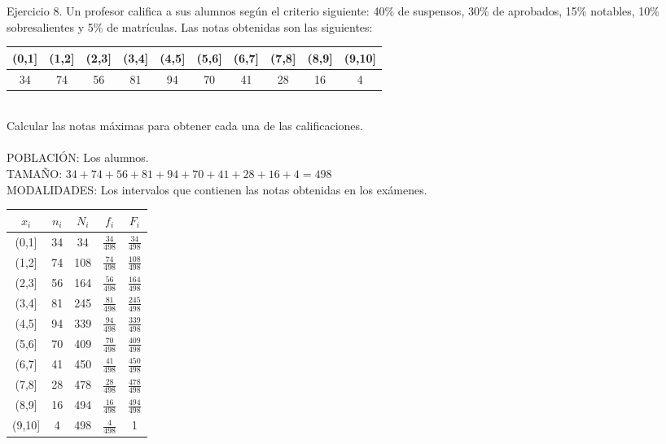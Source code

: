 \documentclass{article}
\begin{document}
    Ejercicio 8. Un profesor califica a sus alumnos según el criterio siguiente: 40\% de suspensos, 30\% de aprobados, 15\% notables, 10\% sobresalientes y 5\% de matrículas. Las notas obtenidas son las siguientes: \\
    
    \begin{tabular}{| c | c | c | c | c | c | c | c | c | c |}
        \hline
        (0,1] & (1,2] & (2,3] & (3,4] & (4,5] & (5,6] & (6,7] & (7,8] & (8,9] & (9,10] \\ \hline
        34 & 74 & 56 & 81 & 94 & 70 & 41 & 28 & 16 & 4 \\ \hline
    \end{tabular} \\
    
    Calcular las notas máximas para obtener cada una de las calificaciones. 
    \\
    \\
    POBLACIÓN: Los alumnos. \\
    TAMAÑO: $34+74+56+81+94+70+41+28+16+4=498$ \\
    MODALIDADES: Los intervalos que contienen las notas obtenidas en los exámenes. \\
    
    \begin{center}
    \begin{tabular}{| c | c | c | c | c |}
        \hline
        $x_i$ & $n_i$ & $N_i$ & $f_i$ & $F_i$ \\ \hline
        (0,1] & 34 & 34 & $\frac{34}{498}$ & $\frac{34}{498}$ \\
        (1,2] & 74 & 108 & $\frac{74}{498}$ & $\frac{108}{498}$ \\
        (2,3] & 56 & 164 & $\frac{56}{498}$ & $\frac{164}{498}$ \\
        (3,4] & 81 & 245 & $\frac{81}{498}$ & $\frac{245}{498}$ \\
        (4,5] & 94 & 339 & $\frac{94}{498}$ & $\frac{339}{498}$ \\
        (5,6] & 70 & 409 & $\frac{70}{498}$ & $\frac{409}{498}$\\
        (6,7] & 41 & 450 & $\frac{41}{498}$ & $\frac{450}{498}$\\
        (7,8] & 28 & 478 & $\frac{28}{498}$ & $\frac{478}{498}$\\
        (8,9] & 16 & 494 & $\frac{16}{498}$ & $\frac{494}{498}$\\
        (9,10] & 4 & 498 & $\frac{4}{498}$ & 1 \\ \hline
    \end{tabular}
    \end{center}
    
\end{document}

